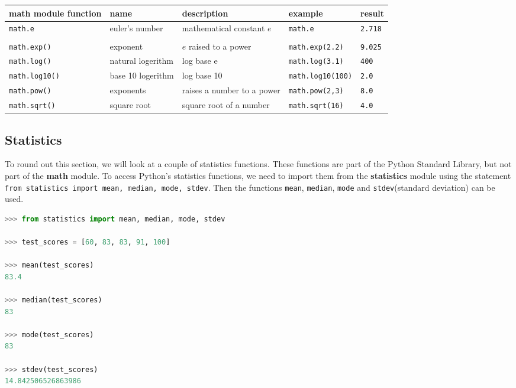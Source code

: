 \documentclass{book}
\newcommand{\passthrough}[1]{#1}
\begin{document}
\begin{longtable}[]{@{}lllll@{}}
\toprule
math module function & name & description & example &
result\tabularnewline
\midrule
\endhead
\passthrough{\lstinline!math.e!} & euler's number & mathematical
constant \(e\) & \passthrough{\lstinline!math.e!} &
\passthrough{\lstinline!2.718!}\tabularnewline
& & & &\tabularnewline
\passthrough{\lstinline!math.exp()!} & exponent & \(e\) raised to a
power & \passthrough{\lstinline!math.exp(2.2)!} &
\passthrough{\lstinline!9.025!}\tabularnewline
\passthrough{\lstinline!math.log()!} & natural logerithm & log base e &
\passthrough{\lstinline!math.log(3.1)!} &
\passthrough{\lstinline!400!}\tabularnewline
\passthrough{\lstinline!math.log10()!} & base 10 logerithm & log base 10
& \passthrough{\lstinline!math.log10(100)!} &
\passthrough{\lstinline!2.0!}\tabularnewline
\passthrough{\lstinline!math.pow()!} & exponents & raises a number to a
power & \passthrough{\lstinline!math.pow(2,3)!} &
\passthrough{\lstinline!8.0!}\tabularnewline
\passthrough{\lstinline!math.sqrt()!} & square root & square root of a
number & \passthrough{\lstinline!math.sqrt(16)!} &
\passthrough{\lstinline!4.0!}\tabularnewline
\bottomrule
\end{longtable}
    




    
        \hypertarget{statistics}{%
\subsection{Statistics}\label{statistics}}

To round out this section, we will look at a couple of statistics
functions. These functions are part of the Python Standard Library, but
not part of the \textbf{math} module. To access Python's statistics
functions, we need to import them from the \textbf{statistics} module
using the statement
\passthrough{\lstinline!from statistics import mean, median, mode, stdev!}.
Then the functions \passthrough{\lstinline!mean!},
\passthrough{\lstinline!median!}, \passthrough{\lstinline!mode!} and
\passthrough{\lstinline!stdev!}(standard deviation) can be used.

\begin{lstlisting}[language=Python]
>>> from statistics import mean, median, mode, stdev
    
>>> test_scores = [60, 83, 83, 91, 100]
    
>>> mean(test_scores)
83.4

>>> median(test_scores)
83

>>> mode(test_scores)
83
    
>>> stdev(test_scores)
14.842506526863986 
\end{lstlisting}
\end{document}
